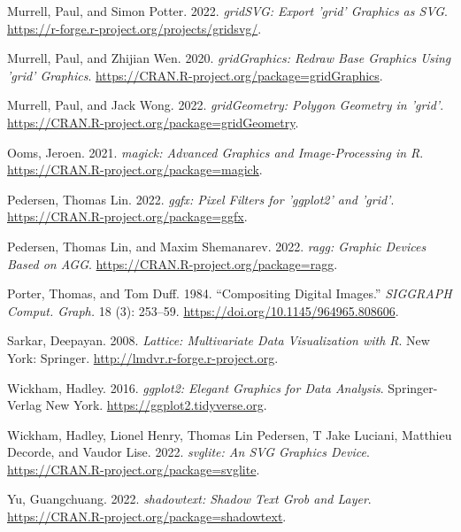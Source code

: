\begin{CSLReferences}{1}{0}
\leavevmode{}%
Murrell, Paul, and Simon Potter. 2022. \emph{{gridSVG}: Export {'grid'} Graphics as {SVG}}. \url{https://r-forge.r-project.org/projects/gridsvg/}.

\leavevmode{}%
Murrell, Paul, and Zhijian Wen. 2020. \emph{{gridGraphics}: Redraw Base Graphics Using {'grid'} Graphics}. \url{https://CRAN.R-project.org/package=gridGraphics}.

\leavevmode{}%
Murrell, Paul, and Jack Wong. 2022. \emph{{gridGeometry}: Polygon Geometry in {'grid'}}. \url{https://CRAN.R-project.org/package=gridGeometry}.

\leavevmode{}%
Ooms, Jeroen. 2021. \emph{{magick}: Advanced Graphics and Image-Processing in {R}}. \url{https://CRAN.R-project.org/package=magick}.

\leavevmode{}%
Pedersen, Thomas Lin. 2022. \emph{{ggfx}: Pixel Filters for {'ggplot2'} and {'grid'}}. \url{https://CRAN.R-project.org/package=ggfx}.

\leavevmode{}%
Pedersen, Thomas Lin, and Maxim Shemanarev. 2022. \emph{{ragg}: Graphic Devices Based on {AGG}}. \url{https://CRAN.R-project.org/package=ragg}.

\leavevmode{}%
Porter, Thomas, and Tom Duff. 1984. {``Compositing Digital Images.''} \emph{SIGGRAPH Comput. Graph.} 18 (3): 253--59. \url{https://doi.org/10.1145/964965.808606}.

\leavevmode{}%
Sarkar, Deepayan. 2008. \emph{Lattice: Multivariate Data Visualization with {R}}. New York: Springer. \url{http://lmdvr.r-forge.r-project.org}.

\leavevmode{}%
Wickham, Hadley. 2016. \emph{{ggplot2}: Elegant Graphics for Data Analysis}. Springer-Verlag New York. \url{https://ggplot2.tidyverse.org}.

\leavevmode{}%
Wickham, Hadley, Lionel Henry, Thomas Lin Pedersen, T Jake Luciani, Matthieu Decorde, and Vaudor Lise. 2022. \emph{{svglite}: An {SVG} Graphics Device}. \url{https://CRAN.R-project.org/package=svglite}.

\leavevmode{}%
Yu, Guangchuang. 2022. \emph{{shadowtext}: Shadow Text Grob and Layer}. \url{https://CRAN.R-project.org/package=shadowtext}.

\end{CSLReferences}


